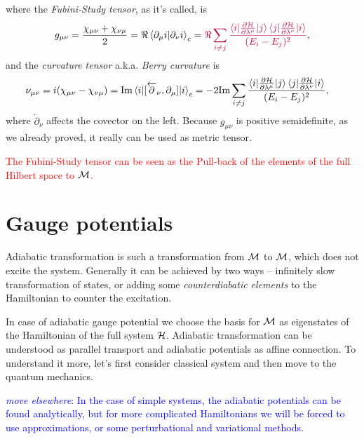 where the \emph{Fubini-Study tensor}, as it's called, is
\begin{equation}
    g_{\mu\nu} = \frac{\chi_{\mu\nu}+\chi_{\nu\mu}}{2} = \Re\braket{\partial_\mu i|\partial_\nu i}_c = \textcolor{purple}{\Re \sum_{i\neq j}\frac{\braket{i|\frac{\partial \mathcal{H}}{\partial \lambda^\mu}|j}\braket{j|\frac{\partial \mathcal{H}}{\partial \lambda^\nu}|i}}{(E_i-E_j)^2}},
    \label{eq:geom.tensorREdefinition}
\end{equation}
and the \emph{curvature tensor} a.k.a. \emph{Berry curvature} is
\begin{equation}
    \begin{split}
        \nu_{\mu\nu} = i(\chi_{\mu\nu}-\chi_{\nu\mu})&= \textrm{Im}\braket{i|[\overleftarrow{\partial}_\nu,\partial_\mu]|i}_c = -2 \textrm{Im} \sum_{i\neq j}\frac{\braket{i|\frac{\partial \mathcal{H}}{\partial \lambda^\mu}|j}\braket{j|\frac{\partial \mathcal{H}}{\partial \lambda^\nu}|i}}{(E_i-E_j)^2},
    \end{split}
\end{equation}
where $\overleftarrow{\partial}_\nu$ affects the covector on the left.
Because $g_{\mu\nu}$ is positive semidefinite, as we already proved, it really can be used as metric tensor.

\textcolor{red}{The Fubini-Study tensor can be seen as the Pull-back of the elements of the full Hilbert space to $\mathcal{M}$. }










\section{Gauge potentials}
Adiabatic transformation is such a transformation from $\mathcal{M}$ to $\mathcal{M}$, which does not excite the system. Generally it can be achieved by two ways -- infinitely slow transformation of states, or adding some \emph{counterdiabatic elements} to the Hamiltonian to counter the excitation.


In case of adiabatic gauge potential we choose the basis for $\mathcal{M}$ as eigenstates of the Hamiltonian of the full system $\mathcal{H}$. Adiabatic transformation can be understood as parallel transport and adiabatic potentials as affine connection. To understand it more, let's first consider classical system and then move to the quantum mechanics.


\textcolor{blue}{\emph{move elsewhere}: In the case of simple systems, the adiabatic potentials can be found analytically, but for more complicated Hamiltonians we will be forced to use approximations, or some perturbational and variational methods.}




